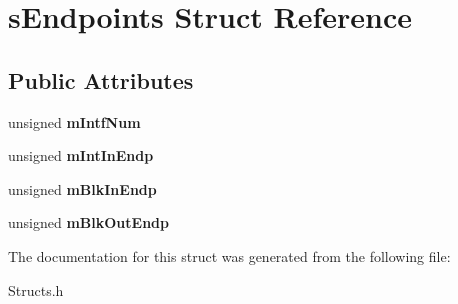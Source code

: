 \hypertarget{structsEndpoints}{\section{s\-Endpoints \-Struct \-Reference}
\label{structsEndpoints}
}
\subsection*{\-Public \-Attributes}
\begin{DoxyCompactItemize}
\item 
\hypertarget{structsEndpoints_ae1debab582e570ee542925dfede2b5b7}{unsigned {\bfseries m\-Intf\-Num}}\label{structsEndpoints_ae1debab582e570ee542925dfede2b5b7}

\item 
\hypertarget{structsEndpoints_a24e28b32dc033c72904335a82d25885f}{unsigned {\bfseries m\-Int\-In\-Endp}}\label{structsEndpoints_a24e28b32dc033c72904335a82d25885f}

\item 
\hypertarget{structsEndpoints_a6260df44b516f25fb57ec701a222556f}{unsigned {\bfseries m\-Blk\-In\-Endp}}\label{structsEndpoints_a6260df44b516f25fb57ec701a222556f}

\item 
\hypertarget{structsEndpoints_afdfe6538d483e2c83d129d8467a5e858}{unsigned {\bfseries m\-Blk\-Out\-Endp}}\label{structsEndpoints_afdfe6538d483e2c83d129d8467a5e858}

\end{DoxyCompactItemize}


\-The documentation for this struct was generated from the following file\-:\begin{DoxyCompactItemize}
\item 
\-Structs.\-h\end{DoxyCompactItemize}
